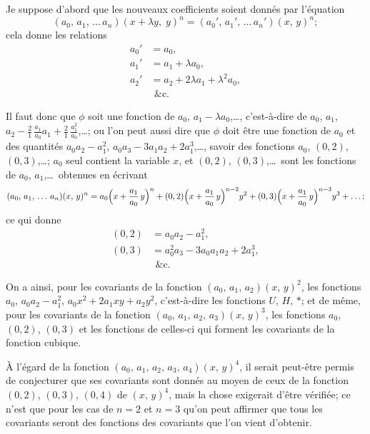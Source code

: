 \documentclass[11pt,a4paper]{book}
\begin{document}
Je suppose d'abord que les nouveaux coefficients soient donn\'es par
l'\'equation
\[
(a_0,\, a_1,\, \ldots\, a_n)(x + \lambda y,\; y)^n
= (a_0',\, a_1',\, \ldots\, a_n')(x,\, y)^n;
\]
cela donne les relations
\begin{align*}
a_0' &= a_0, \\
a_1' &= a_1 + \lambda a_0, \\
a_2' &= a_2 + 2\lambda a_1 + \lambda^2 a_0, \\
& \ \,\text{\&c.}
\end{align*}

Il faut donc que $\phi$ soit une fonction de $a_0$, $a_1 - \lambda a_0$,\ldots,
c'est-\`a-dire de $a_0$, $a_1$, $a_2 - \tfrac{2}{1}\,\tfrac{a_1}{a_0}a_1 + \tfrac{2}{1}\,\tfrac{a_1^2}{a_0}$,\ldots;
ou l'on peut aussi dire que $\phi$ doit \^etre une fonction de $a_0$ et des
quantit\'es $a_0a_2 - a_1^2$, $a_0a_3 - 3a_1a_2 + 2a_1^3$,\ldots, savoir des
fonctions $a_0$, $(0,2)$, $(0,3)$,\ldots; $a_0$ seul contient la variable $x$,
et $(0,2)$, $(0,3)$,\ldots\ sont les fonctions de $a_0$, $a_1$,\ldots\ obtenues
en \'ecrivant
\[
(a_0,\, a_1,\, \ldots\, a_n)(x,\, y)^n
= a_0\Bigl(x + \frac{a_1}{a_0}\,y\Bigr)^n
+ (0,2)\Bigl(x + \frac{a_1}{a_0}\,y\Bigr)^{n-2} y^2
+ (0,3)\Bigl(x + \frac{a_1}{a_0}\,y\Bigr)^{n-3} y^3 + \ldots;
\]
ce qui donne
\begin{align*}
(0,2) &= a_0a_2 - a_1^2, \\
(0,3) &= a_0^2a_3 - 3a_0a_1a_2 + 2a_1^3, \\
& \ \,\text{\&c.}
\end{align*}

\medskip

On a ainsi, pour les covariants de la fonction $(a_0,\, a_1,\, a_2)(x,\, y)^2$,
les fonctions $a_0$, $a_0a_2 - a_1^2$, $a_0 x^2 + 2a_1 xy + a_2 y^2$, c'est-\`a-dire
les fonctions $U$, $H$, $*$; et de m\^eme, pour les covariants de la fonction
$(a_0,\, a_1,\, a_2,\, a_3)(x,\, y)^3$, les fonctions $a_0$, $(0,2)$, $(0,3)$
et les fonctions de celles-ci qui forment les covariants de la fonction cubique.

\medskip

\`A l'\'egard de la fonction $(a_0,\, a_1,\, a_2,\, a_3,\, a_4)(x,\, y)^4$, il
serait peut-\^etre permis de conjecturer que ses covariants sont donn\'es au
moyen de ceux de la fonction $(0,2)$, $(0,3)$, $(0,4)$ de $(x,\, y)^4$, mais
la chose exigerait d'\^etre v\'erifi\'ee; ce n'est que pour les cas de
$n=2$ et $n=3$ qu'on peut affirmer que tous les covariants seront des
fonctions des covariants que l'on vient d'obtenir.
\end{document}
